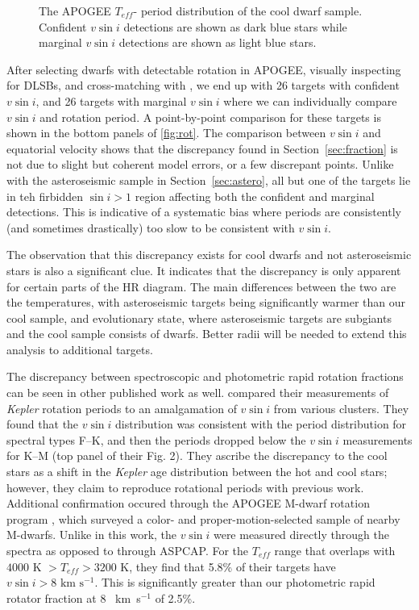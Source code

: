 \documentclass[manuscript]{aastex6}
\newcommand{\vsini}{\ensuremath{v \sin i}}
\newcommand{\Kepler}{\mbox{\textit{Kepler}}}
\newcommand{\Teff}{\ensuremath{T_{eff}}}
\newcommand{\kms}{\textrm{~km~s}\ensuremath{^{-1}}}
\begin{document}
\begin{figure}
  \caption{The APOGEE \Teff-\citet{McQuillan14} period distribution of the 
  cool dwarf sample. Confident \vsini{} detections are shown as dark blue
  stars while marginal \vsini{} detections are shown as light blue
  stars.\label{fig:periods}}
\end{figure}

After selecting dwarfs with detectable rotation in APOGEE,
visually inspecting for DLSBs, and cross-matching with \citet{McQuillan14}, we 
end up with 26 targets with confident \vsini{}, and 26 targets with marginal
\vsini{} where we can individually compare \vsini{} and rotation period. A 
point-by-point
comparison for these targets is shown in the bottom panels of
\cref{fig:rot}. The comparison between \vsini{} and equatorial velocity shows
that the discrepancy found in Section~\ref{sec:fraction} is not due to slight
but coherent model errors, or a few discrepant points. Unlike with the
asteroseismic sample in Section~\ref{sec:astero}, all but one of the targets
lie in teh firbidden \(\sin i > 1\) region affecting both the confident and
marginal detections. This is indicative of a systematic
bias where periods are consistently (and sometimes drastically) too slow to be
consistent with \vsini{}.

The observation that this discrepancy exists for cool dwarfs and not
asteroseismic stars is also a significant clue. It indicates that the
discrepancy is only apparent for certain parts of the HR diagram. The main
differences between the two are the temperatures, with asteroseismic targets
being significantly warmer than our cool sample, and evolutionary state, where
asteroseismic targets are subgiants and the cool sample consists of dwarfs.
Better radii will be needed to extend this analysis to additional targets.

The discrepancy between spectroscopic and 
photometric rapid rotation fractions can be seen in other published work as well. 
\citet{Nielsen13} compared their measurements of \Kepler{} rotation periods to
an amalgamation of \vsini{} from various clusters. They found that the
\vsini{} distribution was consistent with the period distribution for spectral
types F--K, and then the periods dropped below the \vsini{} measurements for
K--M (top panel of their Fig. 2). They ascribe the discrepancy to the cool
stars as a shift in the \Kepler{} age distribution between the hot and cool
stars; however, they claim to reproduce rotational periods with previous work. 
Additional confirmation occured through the APOGEE M-dwarf rotation
program \citep{Gilhool18}, which surveyed a color- and proper-motion-selected 
sample of nearby M-dwarfs. Unlike in this work, the \vsini{} were measured 
directly through the spectra as opposed to through ASPCAP\@. For the \Teff{} range that
overlaps with \citet{McQuillan14} \(4000 \textrm{ K } > \Teff > 3200\) K, they 
find that 5.8\% of their targets have \(\vsini > 8 \kms\). This is 
significantly greater than our photometric rapid rotator fraction at 8 \kms{} 
of 2.5\%. 
\end{document}
